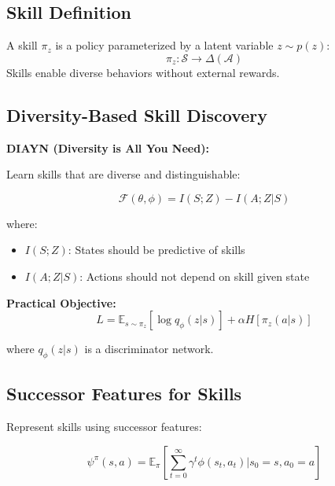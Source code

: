 \subsection{Skill Definition}

\begin{definition}[Skill]
A skill $\pi_z$ is a policy parameterized by a latent variable $z \sim p(z)$:
\begin{equation}
\pi_z: \mathcal{S} \to \Delta(\mathcal{A})
\end{equation}
Skills enable diverse behaviors without external rewards.
\end{definition}

\subsection{Diversity-Based Skill Discovery}

\textbf{DIAYN (Diversity is All You Need):}

Learn skills that are diverse and distinguishable:

\begin{equation}
\mathcal{F}(\theta, \phi) = I(S; Z) - I(A; Z | S)
\end{equation}

where:
\begin{itemize}
    \item $I(S; Z)$: States should be predictive of skills
    \item $I(A; Z | S)$: Actions should not depend on skill given state
\end{itemize}

\textbf{Practical Objective:}
\begin{equation}
L = \mathbb{E}_{s \sim \pi_z} [\log q_\phi(z|s)] + \alpha H[\pi_z(a|s)]
\end{equation}

where $q_\phi(z|s)$ is a discriminator network.

\subsection{Successor Features for Skills}

Represent skills using successor features:

\begin{equation}
\psi^\pi(s, a) = \mathbb{E}_\pi \left[ \sum_{t=0}^\infty \gamma^t \phi(s_t, a_t) \bigg| s_0 = s, a_0 = a \right]
\end{equation}

